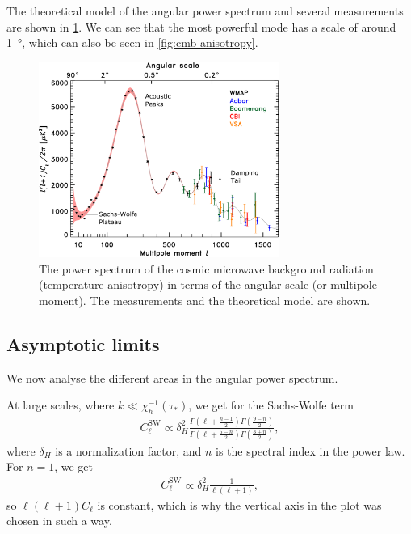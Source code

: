 The theoretical model of the angular power spectrum and several measurements are shown in \cref{fig:power-spectrum}. We can see that the most powerful mode has a scale of around \SI{1}{\degree}, which can also be seen in \cref{fig:cmb-anisotropy}.

\begin{figure}
	\centering
	\includegraphics[width=0.7\textwidth]{img/ch-03/power-spectrum.pdf}
	\caption{The power spectrum of the cosmic microwave background radiation (temperature anisotropy) in terms of the angular scale (or multipole moment). The measurements and the theoretical model are shown.}
	\label{fig:power-spectrum}
\end{figure}

\subsection{Asymptotic limits}
We now analyse the different areas in the angular power spectrum.

At large scales, where $k \ll \chi_h^{-1}(\tau_*)$, we get for the Sachs-Wolfe term
\begin{align*}
	C_\ell^\text{SW} \propto \delta_H^2 \frac{
	\Gamma\left(\ell+\frac{n-1}{2}\right)
	\Gamma\left(\frac{9-n}{2}\right) 
	}{
	\Gamma\left(\ell+\frac{5-n}{2}\right)
	\Gamma\left(\frac{3+n}{2}\right)
	},
\end{align*}
where $\delta_H$ is a normalization factor, and $n$ is the spectral index in the power law. For $n=1$, we get
\begin{align*}
	C_\ell^{\text{SW}} \propto \delta_H^2 \frac{1}{\ell(\ell+1)},
\end{align*}
so $\ell(\ell+1) C_\ell$ is constant, which is why the vertical axis in the plot was chosen in such a way.

